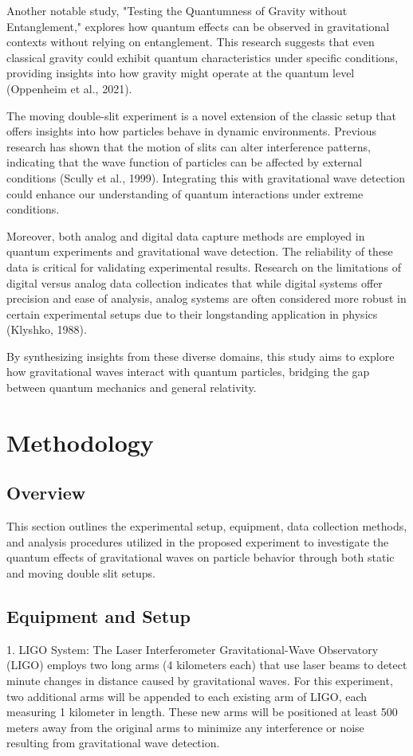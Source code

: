 \documentclass{article}
\begin{document}
Another notable study, "Testing the Quantumness of Gravity without Entanglement," explores how quantum effects can be observed in gravitational contexts without relying on entanglement. This research suggests that even classical gravity could exhibit quantum characteristics under specific conditions, providing insights into how gravity might operate at the quantum level (Oppenheim et al., 2021).

The moving double-slit experiment is a novel extension of the classic setup that offers insights into how particles behave in dynamic environments. Previous research has shown that the motion of slits can alter interference patterns, indicating that the wave function of particles can be affected by external conditions (Scully et al., 1999). Integrating this with gravitational wave detection could enhance our understanding of quantum interactions under extreme conditions.

Moreover, both analog and digital data capture methods are employed in quantum experiments and gravitational wave detection. The reliability of these data is critical for validating experimental results. Research on the limitations of digital versus analog data collection indicates that while digital systems offer precision and ease of analysis, analog systems are often considered more robust in certain experimental setups due to their longstanding application in physics (Klyshko, 1988).

By synthesizing insights from these diverse domains, this study aims to explore how gravitational waves interact with quantum particles, bridging the gap between quantum mechanics and general relativity.

\section{Methodology}

\subsection{Overview}
This section outlines the experimental setup, equipment, data collection methods, and analysis procedures utilized in the proposed experiment to investigate the quantum effects of gravitational waves on particle behavior through both static and moving double slit setups.

\subsection{Equipment and Setup}
1. LIGO System: The Laser Interferometer Gravitational-Wave Observatory (LIGO) employs two long arms (4 kilometers each) that use laser beams to detect minute changes in distance caused by gravitational waves. For this experiment, two additional arms will be appended to each existing arm of LIGO, each measuring 1 kilometer in length. These new arms will be positioned at least 500 meters away from the original arms to minimize any interference or noise resulting from gravitational wave detection.
\end{document}
